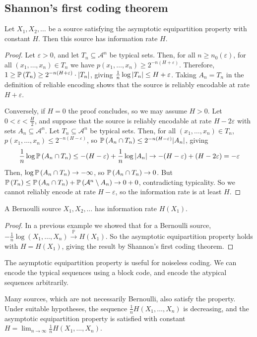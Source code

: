 \subsection{Shannon's first coding theorem}
\begin{theorem}
    Let \( X_1, X_2, \dots \) be a source satisfying the asymptotic equipartition property with constant \( H \).
    Then this source has information rate \( H \).
\end{theorem}
\begin{proof}
    Let \( \varepsilon > 0 \), and let \( T_n \subseteq \mathcal A^n \) be typical sets.
    Then, for all \( n \geq n_0(\varepsilon) \), for all \( (x_1, \dots, x_n) \in T_n \) we have \( p(x_1, \dots, x_n) \geq 2^{-n(H + \varepsilon)} \).
    Therefore, \( 1 \geq \mathbb{P}\left({T_n}\right) \geq 2^{-n(H + \varepsilon)} \cdot \abs{T_n} \), giving \( \frac{1}{n} \log \abs{T_n} \leq H + \varepsilon \).
    Taking \( A_n = T_n \) in the definition of reliable encoding shows that the source is reliably encodable at rate \( H + \varepsilon \).

    Conversely, if \( H = 0 \) the proof concludes, so we may assume \( H > 0 \).
    Let \( 0 < \varepsilon < \frac{H}{2} \), and suppose that the source is reliably encodable at rate \( H - 2\varepsilon \) with sets \( A_n \subseteq \mathcal A^n \).
    Let \( T_n \subseteq \mathcal A^n \) be typical sets.
    Then, for all \( (x_1, \dots, x_n) \in T_n \), \( p(x_1, \dots, x_n) \leq 2^{-n(H - \varepsilon)} \), so \( \mathbb{P}\left({A_n \cap T_n}\right) \leq 2^{-n(H - \varepsilon)} \abs{A_n} \), giving
    \[ \frac{1}{n} \log \mathbb{P}\left({A_n \cap T_n}\right) \leq -(H - \varepsilon) + \frac{1}{n} \log \abs{A_n} \to -(H - \varepsilon) + (H - 2 \varepsilon) = -\varepsilon \]
    Then, \( \log \mathbb{P}\left({A_n \cap T_n}\right) \to -\infty \), so \( \mathbb{P}\left({A_n \cap T_n}\right) \to 0 \).
    But \( \mathbb{P}\left({T_n}\right) \leq \mathbb{P}\left({A_n \cap T_n}\right) + \mathbb{P}\left({\mathcal A^n \setminus A_n}\right) \to 0 + 0 \), contradicting typicality.
    So we cannot reliably encode at rate \( H - \varepsilon \), so the information rate is at least \( H \).
\end{proof}
\begin{corollary}
    A Bernoulli source \( X_1, X_2, \dots \) has information rate \( H(X_1) \).
\end{corollary}
\begin{proof}
    In a previous example we showed that for a Bernoulli source, \( -\frac{1}{n} \log(X_1, \dots, X_n) \xrightarrow{\mathbb P} H(X_1) \).
    So the asymptotic equipartition property holds with \( H = H(X_1) \), giving the result by Shannon's first coding theorem.
\end{proof}
\begin{remark}
    The asymptotic equipartition property is useful for noiseless coding.
    We can encode the typical sequences using a block code, and encode the atypical sequences arbitrarily.

    Many sources, which are not necessarily Bernoulli, also satisfy the property.
    Under suitable hypotheses, the sequence \( \frac{1}{n} H(X_1, \dots, X_n) \) is decreasing, and the asymptotic equipartition property is satisfied with constant \( H = \lim_{n \to \infty} \frac{1}{n} H(X_1, \dots, X_n) \).
\end{remark}

